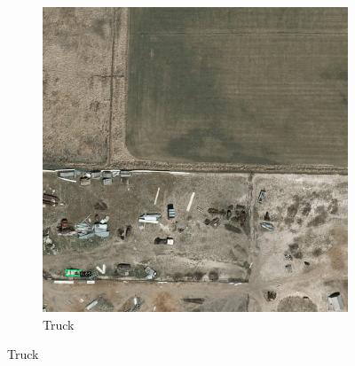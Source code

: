 \begin{figure}[h!]
\begin{subfigure}[t]{0.38\textwidth}
        \includegraphics[width=\linewidth]{images/015Results/01abb_vs_obb/comp_images/obb/212.png}
        \caption{Truck}
    \end{subfigure}
    

\end{figure}
